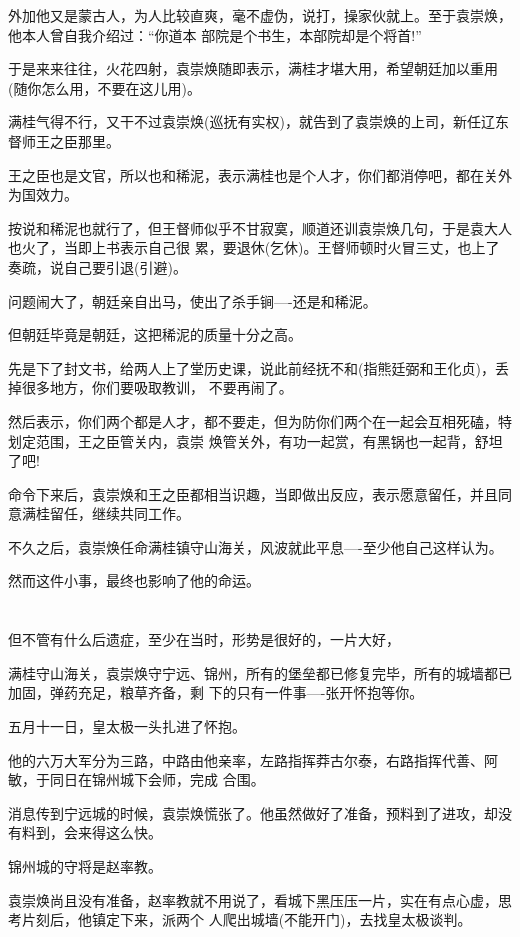 \documentclass[11pt,a4paper,onecolumn]{article}
\begin{document}
外加他又是蒙古人，为人比较直爽，毫不虚伪，说打，操家伙就上。至于袁崇焕，他本人曾自我介绍过：``你道本
部院是个书生，本部院却是个将首!''

于是来来往往，火花四射，袁崇焕随即表示，满桂才堪大用，希望朝廷加以重用(随你怎么用，不要在这儿用)。

满桂气得不行，又干不过袁崇焕(巡抚有实权)，就告到了袁崇焕的上司，新任辽东督师王之臣那里。

王之臣也是文官，所以也和稀泥，表示满桂也是个人才，你们都消停吧，都在关外为国效力。

按说和稀泥也就行了，但王督师似乎不甘寂寞，顺道还训袁崇焕几句，于是袁大人也火了，当即上书表示自己很
累，要退休(乞休)。王督师顿时火冒三丈，也上了奏疏，说自己要引退(引避)。

问题闹大了，朝廷亲自出马，使出了杀手锏----还是和稀泥。

但朝廷毕竟是朝廷，这把稀泥的质量十分之高。

先是下了封文书，给两人上了堂历史课，说此前经抚不和(指熊廷弼和王化贞)，丢掉很多地方，你们要吸取教训，
不要再闹了。

然后表示，你们两个都是人才，都不要走，但为防你们两个在一起会互相死磕，特划定范围，王之臣管关内，袁崇
焕管关外，有功一起赏，有黑锅也一起背，舒坦了吧!

命令下来后，袁崇焕和王之臣都相当识趣，当即做出反应，表示愿意留任，并且同意满桂留任，继续共同工作。

不久之后，袁崇焕任命满桂镇守山海关，风波就此平息----至少他自己这样认为。

然而这件小事，最终也影响了他的命运。

\section[\thesection]{}

但不管有什么后遗症，至少在当时，形势是很好的，一片大好，

满桂守山海关，袁崇焕守宁远、锦州，所有的堡垒都已修复完毕，所有的城墙都已加固，弹药充足，粮草齐备，剩
下的只有一件事----张开怀抱等你。

五月十一日，皇太极一头扎进了怀抱。

他的六万大军分为三路，中路由他亲率，左路指挥莽古尔泰，右路指挥代善、阿敏，于同日在锦州城下会师，完成
合围。

消息传到宁远城的时候，袁崇焕慌张了。他虽然做好了准备，预料到了进攻，却没有料到，会来得这么快。

锦州城的守将是赵率教。

袁崇焕尚且没有准备，赵率教就不用说了，看城下黑压压一片，实在有点心虚，思考片刻后，他镇定下来，派两个
人爬出城墙(不能开门)，去找皇太极谈判。
\end{document}
